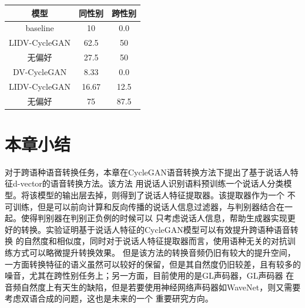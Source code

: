 \begin{table}
    \centering
    \begin{tabular}[t]{ ccc }
        \toprule
        模型  & 同性别 & 跨性别   \\
        \midrule
        baseline    & 10 & 0.0           \\
        LIDV-CycleGAN    & 62.5 & 50           \\
        无偏好    & 27.5 & 50           \\
        \midrule
        DV-CycleGAN    & 8.33 & 0.0           \\
        LIDV-CycleGAN    & 16.67 & 12.5           \\
        无偏好 & 75 & 87.5           \\
        \bottomrule
        \end{tabular} 
    \label{tab:simtable}
\end{table}

\section{本章小结}
对于跨语种语音转换任务，本章在CycleGAN语音转换方法下提出了基于说话人特征d-vector的语音转换方法。该方法
用说话人识别语料预训练一个说话人分类模型。将该模型的输出层去掉，则得到了说话人特征提取器。该提取器作为一个
不可训练，但是可以前向计算和反向传播的说话人信息过滤器，与判别器结合在一起。使得判别器在判别正负例的时候可以
只考虑说话人信息，帮助生成器实现更好的转换。实验证明基于说话人特征的CycleGAN模型可以有效提升跨语种语音转换
的自然度和相似度，同时对于说话人特征提取器而言，使用语种无关的对抗训练方式可以略微提升转换效果。
但是该方法的转换音频仍旧有较大的提升空间，一方面转换特征的语义虽然可以较好的保留，但是其自然度仍旧较差，且有较多的噪音，尤其在跨性别任务上；另一方面，目前使用的是GL声码器，GL声码器
在音频自然度上有天生的缺陷，但是若要使用神经网络声码器如WaveNet，则又需要考虑双语合成的问题，这也是未来的一个
重要研究方向。